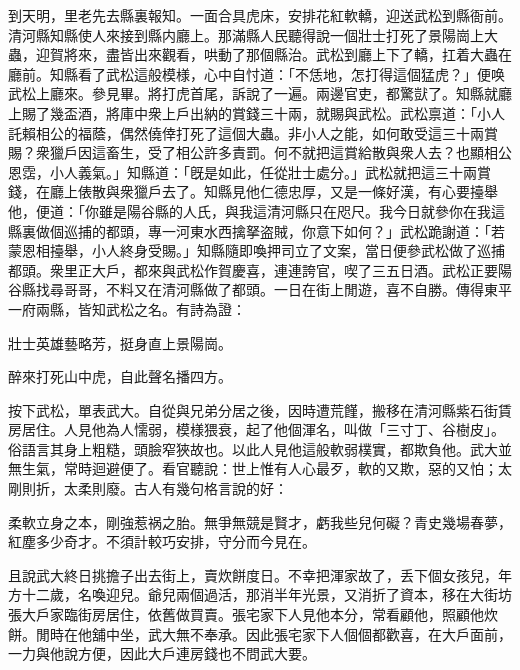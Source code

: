到天明，里老先去縣裏報知。一面合具虎床，安排花紅軟轎，迎送武松到縣衙前。清河縣知縣使人來接到縣内廳上。那滿縣人民聽得說一個壯士打死了景陽崗上大蟲，迎賀將來，盡皆出來觀看，哄動了那個縣治。武松到廳上下了轎，扛着大蟲在廳前。知縣看了武松這般模様，心中自忖道：「不恁地，怎打得這個猛虎？」便唤武松上廳來。參見畢。將打虎首尾，訴說了一遍。兩邊官吏，都驚獃了。知縣就廳上賜了幾盃酒，將庫中衆上戶出納的賞錢三十兩，就賜與武松。武松禀道：「小人託賴相公的福蔭，偶然僥倖打死了這個大蟲。非小人之能，如何敢受這三十兩賞賜？衆獵戶因這畜生，受了相公許多責罰。何不就把這賞給散與衆人去？也顯相公恩霑，小人義氣。」知縣道：「旣是如此，任從壯士處分。」武松就把這三十兩賞錢，在廳上俵散與衆獵戶去了。知縣見他仁德忠厚，又是一條好漢，有心要擡舉他，便道：「你雖是陽谷縣的人氏，與我這清河縣只在咫尺。我今日就參你在我這縣裏做個巡捕的都頭，專一河東水西擒拏盗賊，你意下如何？」武松跪謝道：「若蒙恩相擡舉，小人終身受賜。」知縣隨即喚押司立了文案，當日便參武松做了巡捕都頭。衆里正大戶，都來與武松作賀慶喜，連連誇官，喫了三五日酒。武松正要陽谷縣找尋哥哥，不料又在清河縣做了都頭。一日在街上閒遊，喜不自勝。傳得東平一府兩縣，皆知武松之名。有詩為證：

\begin{myquote}
壯士英雄藝略芳，挺身直上景陽崗。

醉來打死山中虎，自此聲名播四方。
\end{myquote}
	
按下武松，單表武大。自從與兄弟分居之後，因時遭荒饉，搬移在清河縣紫石街賃房居住。人見他為人懦弱，模様猥衰，起了他個渾名，叫做「三寸丁、谷樹皮」。俗語言其身上粗糙，頭臉窄狹故也。以此人見他這般軟弱樸實，都欺負他。武大並無生氣，常時迴避便了。看官聽說：世上惟有人心最歹，軟的又欺，惡的又怕；太剛則折，太柔則廢。古人有幾句格言說的好：

\begin{myquote}
柔軟立身之本，剛強惹祸之胎。無爭無競是賢才，虧我些兒何礙？青史幾場春夢，紅塵多少奇才。不須計較巧安排，守分而今見在。
\end{myquote}

且說武大終日挑擔子出去街上，賣炊餅度日。不幸把渾家故了，丢下個女孩兒，年方十二歲，名喚迎兒。爺兒兩個過活，那消半年光景，又消折了資本，移在大街坊張大戶家臨街房居住，依舊做買賣。張宅家下人見他本分，常看顧他，照顧他炊餅。閒時在他舖中坐，武大無不奉承。因此張宅家下人個個都歡喜，在大戶面前，一力與他說方便，因此大戶連房錢也不問武大要。

